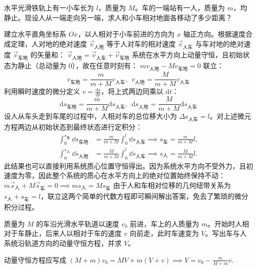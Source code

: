 \documentclass[lang=cn,11pt]{elegantbook}
\begin{document}
\begin{example}
水平光滑铁轨上有一小车长为 $l$，质量为 $M$。车的一端站有一人，质量为 $m$，均静止。现设人从一端走向另一端，求人和小车相对地面各移动了多少距离？
\end{example}
\begin{solution}
建立水平直角坐标系 $Ox$，以人相对于小车前进的方向为 $x$ 轴正方向。根据速度合成定理，人对地的绝对速度 $\vec{v}_{\text{人地}}$ 等于人对车的相对速度 $\vec{v}_{\text{人车}}$ 与车对地的绝对速度 $\vec{v}_{\text{车地}}$ 的矢量和：
 \(\vec{v}_{\text{人地}} = \vec{v}_{\text{人车}} + \vec{v}_{\text{车地}}\) 
系统在水平方向上动量守恒，且初始状态为静止（总动量为 0），故在任意时刻有：
 \(m v_{\text{人地}} - M v_{\text{车地}} = 0\) 
联立：
\[v_{\text{车地}} = \frac{m}{m + M} v_{\text{人车}} ,~~v_{\text{人地}} = \frac{M}{m + M} v_{\text{人车}}\]
利用瞬时速度的微分定义 $v = \frac{\mathrm{d}s}{\mathrm{d}t}$，将上式两边同乘以 $\mathrm{d}t$：
\[\mathrm{d}s_{\text{车地}} = \frac{m}{m + M} \mathrm{d}s_{\text{人车}},~~\mathrm{d}s_{\text{人地}} = \frac{M}{m + M} \mathrm{d}s_{\text{人车}}\]
设人从车头走到车尾的过程中，人相对车的总位移大小为 $\Delta s_{\text{人车}} = l$。对上述微元方程两边从初始状态到最终状态进行定积分：
\[
\begin{aligned}
\int_{0}^{s_{\text{车}}} \dd s_{\text{车地}}
&= \frac{m}{m + M} \int_{0}^{l} \dd s_{\text{人车}}
\implies s_{\text{车}} = \frac{m}{m + M} l,\\
\int_{0}^{s_{\text{人}}} \dd s_{\text{人地}}
&= \frac{M}{m + M} \int_{0}^{l} \dd s_{\text{人车}}
\implies s_{\text{人}} = \frac{M}{m + M} l.
\end{aligned}
\]
此结果也可以直接利用系统质心位置守恒得出。因为系统水平方向不受外力，且初速度为零，因此整个系统的质心在水平方向上的绝对位置始终保持不动：
$m \vec{s}_{\text{人}} + M \vec{s}_{\text{车}} = 0 \implies m s_{\text{人}} = M s_{\text{车}}$
由于人和车相对位移的几何纽带关系为 $s_{\text{人}} + s_{\text{车}} = l$，联立这两个简单的代数方程即可瞬间解出答案，免去了繁琐的微分积分过程。
\end{solution}

\begin{exercise}
质量为 \(M\) 的车沿光滑水平轨道以速度 \(v_0\) 前进，车上的人质量为 \(m\)。开始时人相对于车静止，后来人以相对于车的速度 \(v\) 向前走，此时车速变为 \(V\)。写出车与人系统沿轨道方向的动量守恒方程，并求 \(V\)。
\end{exercise}
\begin{solution}
动量守恒方程应写成
 \((M+m)v_0=MV+m(V+v)\implies \boxed{V=v_0-\frac{m}{M+m}v}.\) 
\end{solution}
\end{document}
